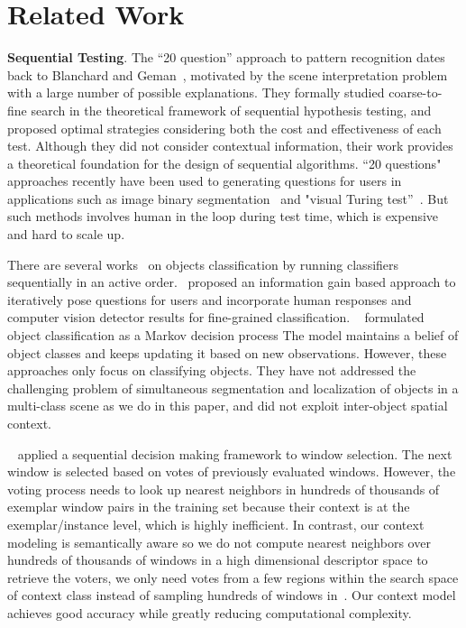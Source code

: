 \section{Related Work}
\label{sec:relatedwork}

{\bf{Sequential Testing}}. 
The ``20 question'' approach to pattern recognition dates back to Blanchard and Geman~\cite{blanchard2005hierarchical}, motivated by the scene interpretation problem with a large number of possible explanations. They formally studied coarse-to-fine search in the theoretical framework of sequential hypothesis testing, and proposed optimal strategies considering both the cost and effectiveness of each test. Although they did not consider contextual information, their work provides a theoretical foundation for the design of sequential algorithms. ``20 questions" approaches recently have been used to generating questions for users in applications such as image binary segmentation~\cite{rupprecht2015image} and "visual Turing test''~\cite{geman2015visual}. But such methods involves human in the loop during test time, which is expensive and hard to scale up. 

There are several works~\cite{gao2011active} on objects classification by running classifiers sequentially in an active order.~\cite{branson2010visual} proposed an information gain based approach to iteratively pose questions for users and incorporate human responses and computer vision detector results for fine-grained classification.
~\cite{sergey2012timely} formulated object classification as a Markov decision process 
The model maintains a belief of object classes and keeps updating it based on new observations.  
However, these approaches only focus on classifying objects. They have not addressed the challenging problem of simultaneous segmentation and localization of objects in a multi-class scene as we do in this paper, and did not exploit inter-object spatial context.

~\cite{bogdan2012context} applied a sequential decision making framework to window selection. The next window is selected based on votes of previously evaluated windows. However, the voting process needs to look up nearest neighbors in hundreds of thousands of exemplar window pairs in the training set because their context is at the exemplar/instance level, which is highly inefficient. In contrast, our context modeling is semantically aware so we do not compute nearest neighbors over hundreds of thousands of windows in a high dimensional descriptor space to retrieve the voters, we only need votes from a few regions within the search space of context class instead of sampling hundreds of windows in~\cite{bogdan2012context}. Our context model achieves good accuracy while greatly reducing computational complexity.

